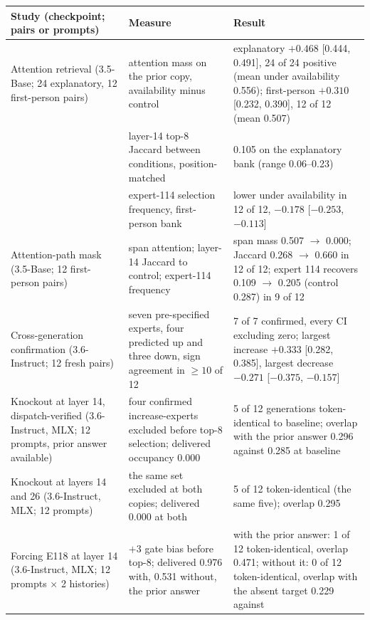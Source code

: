 \documentclass[10pt,a4paper,twocolumn]{article}
\begin{document}
\begin{table}[!t]
\footnotesize
\begin{tabularx}{\textwidth}{@{}>{\raggedright\arraybackslash}p{}>{\raggedright\arraybackslash}p{}Y@{}}
\toprule
\textbf{Study (checkpoint; pairs or prompts)} & \textbf{Measure} & \textbf{Result} \\
\midrule
Attention retrieval (3.5-Base; 24 explanatory, 12 first-person pairs)
& attention mass on the prior copy, availability minus control
& explanatory \(+0.468\) [0.444, 0.491], 24 of 24 positive (mean under
availability 0.556); first-person \(+0.310\) [0.232, 0.390], 12 of 12
(mean 0.507) \\
& layer-14 top-8 Jaccard between conditions, position-matched
& 0.105 on the explanatory bank (range 0.06--0.23) \\
& expert-114 selection frequency, first-person bank
& lower under availability in 12 of 12, \(-0.178\) [\(-0.253\), \(-0.113\)] \\
\addlinespace
Attention-path mask (3.5-Base; 12 first-person pairs)
& span attention; layer-14 Jaccard to control; expert-114 frequency
& span mass 0.507 \(\rightarrow\) 0.000; Jaccard 0.268 \(\rightarrow\) 0.660
in 12 of 12; expert 114 recovers 0.109 \(\rightarrow\) 0.205 (control 0.287)
in 9 of 12 \\
\addlinespace
Cross-generation confirmation (3.6-Instruct; 12 fresh pairs)
& seven pre-specified experts, four predicted up and three down, sign
agreement in \(\ge 10\) of 12
& 7 of 7 confirmed, every CI excluding zero; largest increase \(+0.333\)
[0.282, 0.385], largest decrease \(-0.271\) [\(-0.375\), \(-0.157\)] \\
\addlinespace
Knockout at layer 14, dispatch-verified (3.6-Instruct, MLX; 12 prompts,
prior answer available)
& four confirmed increase-experts excluded before top-8 selection;
delivered occupancy 0.000
& 5 of 12 generations token-identical to baseline; overlap with the prior
answer 0.296 against 0.285 at baseline \\
Knockout at layers 14 and 26 (3.6-Instruct, MLX; 12 prompts)
& the same set excluded at both copies; delivered 0.000 at both
& 5 of 12 token-identical (the same five); overlap 0.295 \\
Forcing E118 at layer 14 (3.6-Instruct, MLX; 12 prompts \(\times\) 2
histories)
& \(+3\) gate bias before top-8; delivered 0.976 with, 0.531 without, the
prior answer
& with the prior answer: 1 of 12 token-identical, overlap 0.471; without
it: 0 of 12 token-identical, overlap with the absent target 0.229 against

\end{tabularx}
\end{table}
\end{document}

